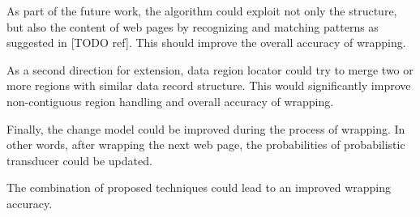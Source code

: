 As part of the future work, the algorithm could exploit not only the structure, but also the content of web pages by recognizing and matching patterns as suggested in [TODO ref]. This should improve the overall accuracy of wrapping.

As a second direction for extension, data region locator could try to merge two or more regions with similar data record structure. This would significantly improve non-contiguous region handling and overall accuracy of wrapping.

Finally, the change model could be improved during the process of wrapping. In other words, after wrapping the next web page, the probabilities of probabilistic transducer could be updated.

The combination of proposed techniques could lead to an improved wrapping accuracy.


